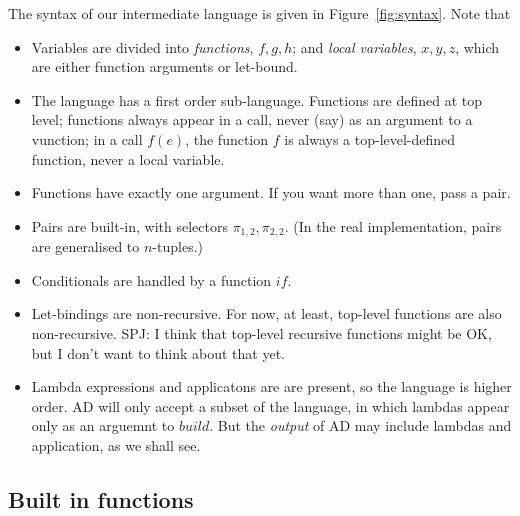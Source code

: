\documentclass[sigplan,review]{acmart}
\newcommand{\sel}[2]{\pi_{#1,#2}}
\newcommand{\iffun}{\mathit{if}}
\newcommand{\buildfun}{\mathit{build}}
\newcommand{\simon}[1]{{\color{red}SPJ: #1}}
\begin{document}
The syntax of our intermediate language is given in Figure~\ref{fig:syntax}.
Note that
\begin{itemize}
\item  Variables are divided into \emph{functions}, $f,g,h$; and \emph{local variables}, $x,y,z$,
  which are either function arguments or let-bound.
\item 
  The language has a first order sub-language.  Functions are defined at top level;
  functions always appear in a call, never (say) as an argument to a
  vunction; in a call $f(e)$, the function $f$ is always a
  top-level-defined function, never a local variable.

\item Functions have exactly one argument. If you want more than one, pass a pair.

\item Pairs are built-in, with selectors $\sel{1}{2}, \sel{2}{2}$.
  (In the real implementation, pairs are generalised to $n$-tuples.)

\item Conditionals are handled by a function $\iffun$.

\item Let-bindings are non-recursive. For now, at least, top-level
  functions are also non-recursive.  \simon{I think that top-level
    recursive functions might be OK, but I don't want to think about
    that yet.}

\item Lambda expressions and applicatons are are present, so the language
  is higher order.  AD will only accept a subset of the language, in
  which lambdas appear only as an arguemnt to $\buildfun$.  But the
  \emph{output} of AD may include lambdas and application, as we shall see.
  \end{itemize}

\subsection{Built in functions}
\end{document}
